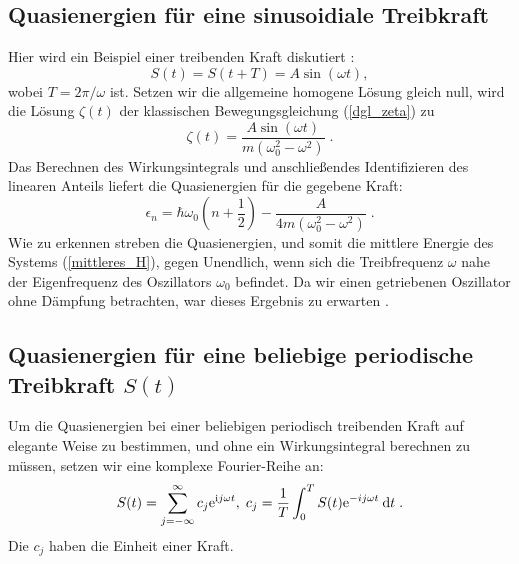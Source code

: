   \subsection{Quasienergien für eine sinusoidiale Treibkraft}
    Hier wird ein Beispiel einer treibenden Kraft diskutiert \cite{haenggi}:
    \begin{equation}
      S(t) = S(t+T) = A\sin(\omega t),
    \end{equation}
    wobei $T=2\pi / \omega$ ist.
    Setzen wir die allgemeine homogene Lösung gleich null, wird die Lösung $\zeta(t)$ der klassischen Bewegungsgleichung (\ref{dgl_zeta}) zu \cite{mads}
    \begin{equation}
      \zeta(t) = \frac{A\sin(\omega t)}{m(\omega_0^2 - \omega^2)} \; .
    \end{equation}
    Das Berechnen des Wirkungsintegrals und anschließendes Identifizieren des linearen Anteils liefert die Quasienergien für die gegebene Kraft:
    \begin{equation}
      \epsilon_n  = \hbar \omega_0\left(n+\frac{1}{2}\right) - \frac{A}{4m(\omega_0^2-\omega^2)} \;.
    \end{equation}
    Wie zu erkennen streben die Quasienergien, und somit die mittlere Energie des Systems (\ref{mittleres_H}), gegen Unendlich, wenn sich die Treibfrequenz $\omega$ nahe der Eigenfrequenz des Oszillators $\omega_0 $ befindet.
    Da wir einen getriebenen Oszillator ohne Dämpfung betrachten, war dieses Ergebnis zu erwarten \cite{mads}.


\subsection{Quasienergien für eine beliebige periodische Treibkraft $S(t)$}
  Um die Quasienergien bei einer beliebigen periodisch treibenden Kraft auf elegante Weise zu bestimmen, und ohne ein Wirkungsintegral berechnen zu müssen, setzen wir eine komplexe Fourier-Reihe an:
  \begin{equation}
    S(t) = \sum_{j=-\infty}^\infty c_j \text e^{\text ij\omega t}, \; c_j = \frac{1}{T} \int_0^T S(t) \text e^{-ij\omega t} \: \text d t \; .
  \end{equation}
  Die $c_j$ haben die Einheit einer Kraft.

